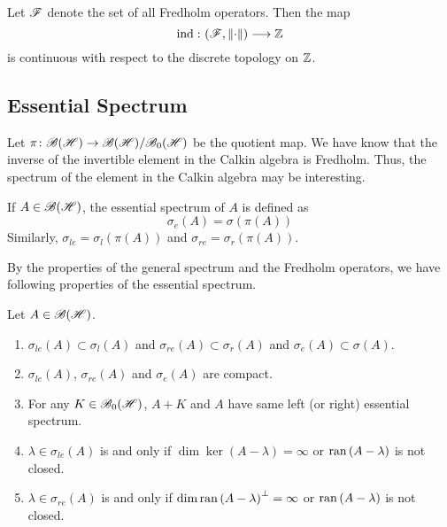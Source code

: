 \begin{cor}
	Let $\mathscr{F}$ denote the set of all Fredholm operators. Then the map
	\begin{equation*}
		\operatorname{ind}{} \colon (\mathscr{F},\left\lVert\cdot\right\lVert) \longrightarrow \mathbb{Z}
	\end{equation*}
	is continuous with respect to the discrete topology on $\mathbb{Z}$. 
\end{cor}

\subsection{Essential Spectrum}

Let $\pi \colon \mathscr{B(H)} \rightarrow \mathscr{B(H)} / \mathscr{B}_{0}\mathscr{(H)}$ be the quotient map. We have know that the inverse of the invertible element in the Calkin algebra is Fredholm. Thus, the spectrum of the element in the Calkin algebra may be interesting.

\begin{defn}
	If $A \in \mathscr{B(H)}$, the essential spectrum of $A$ is defined as
	\begin{equation*}
		\sigma_e(A) = \sigma(\pi(A))
	\end{equation*}
	Similarly, $\sigma_{le} = \sigma_l(\pi(A))$ and $\sigma_{re} = \sigma_r(\pi(A))$.
\end{defn}

By the properties of the general spectrum and the Fredholm operators, we have following properties of the essential spectrum.

\begin{prop}
	Let $A \in \mathscr{B(H)}$.
	\begin{enumerate}[label = \arabic*)]
		\item $\sigma_{le}(A) \subset \sigma_l(A)$ and $\sigma_{re}(A) \subset \sigma_r(A)$ and $\sigma_e(A) \subset \sigma(A)$.
		\item $\sigma_{le}(A)$, $\sigma_{re}(A)$ and $\sigma_e(A)$ are compact.
		\item For any $K \in \mathscr{B}_{0}\mathscr{(H)}$, $A+K$ and $A$ have same left (or right) essential spectrum.
		\item $\lambda \in \sigma_{le}(A)$ is and only if $\dim{\ker{(A-\lambda)}} = \infty$ or $\operatorname{ran}{(A-\lambda)}$ is not closed.
		\item $\lambda \in \sigma_{re}(A)$ is and only if $\dim{\operatorname{ran}{(A-\lambda)}^{\bot}} = \infty$ or $\operatorname{ran}{(A-\lambda)}$ is not closed.
	\end{enumerate}
\end{prop}

